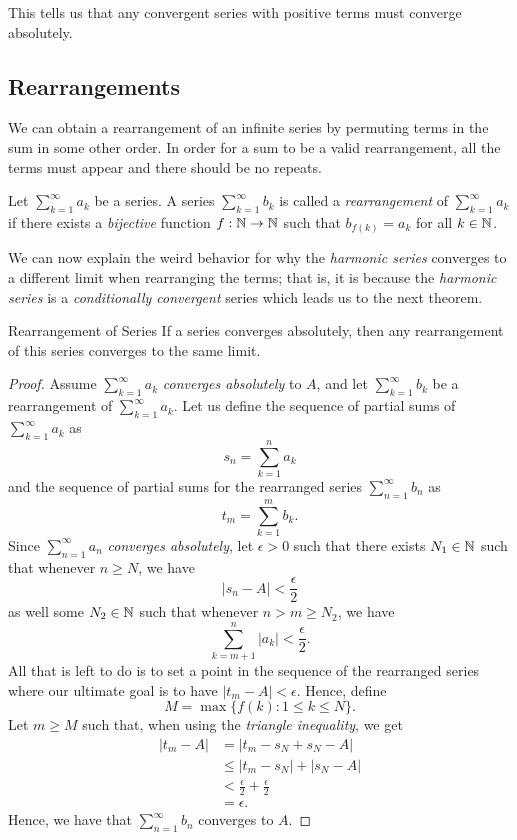 This tells us that any convergent series with positive terms must converge absolutely. 

\subsection{Rearrangements}

We can obtain a rearrangement of an infinite series by permuting terms in the sum in some other order. In order for a sum to be a valid rearrangement, all the terms must appear and there should be no repeats.

\begin{definition}{}{}
    Let \( \sum_{k=1}^{\infty} a_k\) be a series. A series \( \sum_{k=1}^{\infty} b_k\) is called a \textit{rearrangement} of \(\sum_{k=1}^{\infty} a_k \) if there exists a \textit{bijective} function \(f: \mathbb{N} \to \mathbb{N} \) such that \( b_{f(k)} = a_k \) for all \( k \in \mathbb{N} \).
\end{definition}

We can now explain the weird behavior for why the \textit{harmonic series} converges to a different limit when rearranging the terms; that is, it is because the \textit{harmonic series} is a \textit{conditionally convergent} series which leads us to the next theorem. 

\begin{theorem}{Rearrangement of Series}{}
If a series converges absolutely, then any rearrangement of this series converges to the same limit.
\end{theorem}

\begin{proof}
Assume \(\sum_{k=1}^{\infty} a_k \) \textit{converges absolutely} to \(A\), and let \( \sum_{k=1}^{\infty} b_k \) be a rearrangement of \( \sum_{k=1}^{\infty} a_k\). 
Let us define the sequence of partial sums of \( \sum_{k=1}^{\infty} a_k\) as 
\[ s_n = \sum_{k=1}^{n}a_k\] and the sequence of partial sums for the rearranged series \( \sum_{n=1}^{\infty}b_n\) as 
\[ t_m = \sum_{k=1}^{m} b_k.\] Since \( \sum_{n=1}^{\infty}a_n\) \textit{converges absolutely}, let \(\epsilon > 0 \) such that there exists \( N_1 \in \mathbb{N} \) such that whenever \( n \geq N \), we have 
\[ |s_n - A | < \frac{\epsilon}{2}\]
as well some \( N_2 \in \mathbb{N} \) such that whenever \( n > m \geq N_2\), we have 
\[ \sum_{k=m+1}^{n} |a_k| < \frac{\epsilon}{2}.\]
All that is left to do is to set a point in the sequence of the rearranged series where our ultimate goal is to have \( |t_m - A | < \epsilon.\) Hence, define 
\[ M = \max \{ f(k): 1 \leq k \leq N \}.\]
Let \( m \geq M \) such that, when using the \textit{triangle inequality}, we get 
\begin{align*}
    |t_m - A | &= |t_m - s_N + s_N - A |  \\
               &\leq |t_m - s_N | + |s_N - A | \\
               &< \frac{\epsilon}{2} + \frac{\epsilon}{2} \\
               &= \epsilon.
\end{align*}
Hence, we have that \( \sum_{n=1}^{\infty}b_n \) converges to \(A\).
\end{proof}

